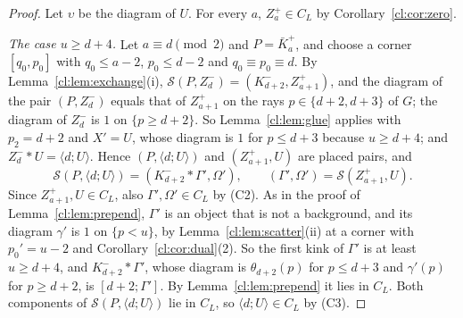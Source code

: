 \begin{proof}
Let $\upsilon$ be the diagram of $U$. For every $a$, $Z^+_a\in C_L$ by Corollary~\ref{cl:cor:zero}.

\emph{The case $u\ge d+4$.} Let $a\equiv d\pmod2$ and $P=\bar K^+_a$, and choose a corner $[q_0,p_0]$ with $q_0\le a-2$, $p_0\le d-2$ and $q_0\equiv p_0\equiv d$. By Lemma~\ref{cl:lem:exchange}(i), $\mathcal S(P,Z^-_d)=(K^-_{d+2},Z^+_{a+1})$, and the diagram of the pair $(P,Z^-_d)$ equals that of $Z^+_{a+1}$ on the rays $p\in\{d+2,d+3\}$ of $G$; the diagram of $Z^-_d$ is $1$ on $\{p\ge d+2\}$. So Lemma~\ref{cl:lem:glue} applies with $p_2=d+2$ and $X'=U$, whose diagram is $1$ for $p\le d+3$ because $u\ge d+4$; and $Z^-_d*U=\langle d;U\rangle$. Hence $(P,\langle d;U\rangle)$ and $(Z^+_{a+1},U)$ are placed pairs, and
\[
\mathcal S(P,\langle d;U\rangle)=(K^-_{d+2}*\Gamma',\Omega'),\qquad(\Gamma',\Omega')=\mathcal S(Z^+_{a+1},U).
\]
Since $Z^+_{a+1},U\in C_L$, also $\Gamma',\Omega'\in C_L$ by (C2). As in the proof of Lemma~\ref{cl:lem:prepend}, $\Gamma'$ is an object that is not a background, and its diagram $\gamma'$ is $1$ on $\{p<u\}$, by Lemma~\ref{cl:lem:scatter}(ii) at a corner with $p_0'=u-2$ and Corollary~\ref{cl:cor:dual}(2). So the first kink of $\Gamma'$ is at least $u\ge d+4$, and $K^-_{d+2}*\Gamma'$, whose diagram is $\theta_{d+2}(p)$ for $p\le d+3$ and $\gamma'(p)$ for $p\ge d+2$, is $[d+2;\Gamma']$. By Lemma~\ref{cl:lem:prepend} it lies in $C_L$. Both components of $\mathcal S(P,\langle d;U\rangle)$ lie in $C_L$, so $\langle d;U\rangle\in C_L$ by (C3).


\end{proof}
